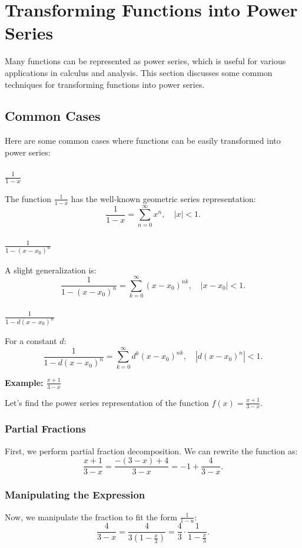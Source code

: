 \section{Transforming Functions into Power Series}

Many functions can be represented as power series, which is useful for various applications in calculus and analysis. This section discusses some common techniques for transforming functions into power series.

\subsection{Common Cases}
Here are some common cases where functions can be easily transformed into power series:

\subsubsection{\(\frac{1}{1 - x}\)}
The function \(\frac{1}{1 - x}\) has the well-known geometric series representation:
\[
\frac{1}{1 - x} = \sum_{n=0}^{\infty} x^n, \quad |x| < 1.
\]

\subsubsection{\(\frac{1}{1 - (x - x_0)^n}\)}
A slight generalization is:
\[
\frac{1}{1 - (x - x_0)^n} = \sum_{k=0}^{\infty} (x - x_0)^{nk}, \quad |x - x_0| < 1.
\]

\subsubsection{\(\frac{1}{1 - d(x - x_0)^n}\)}
For a constant \(d\):
\[
\frac{1}{1 - d(x - x_0)^n} = \sum_{k=0}^{\infty} d^k (x - x_0)^{nk}, \quad |d(x - x_0)^n| < 1.
\]

\textbf{Example: \(\frac{x + 1}{3 - x}\)}

Let's find the power series representation of the function \(f(x) = \frac{x + 1}{3 - x}\).

\subsubsection{Partial Fractions}

First, we perform partial fraction decomposition. We can rewrite the function as:
\[
\frac{x + 1}{3 - x} = \frac{-(3 - x) + 4}{3 - x} = -1 + \frac{4}{3 - x}.
\]

\subsubsection{Manipulating the Expression}
Now, we manipulate the fraction to fit the form \(\frac{1}{1 - u}\):
\[
\frac{4}{3 - x} = \frac{4}{3(1 - \frac{x}{3})} = \frac{4}{3} \cdot \frac{1}{1 - \frac{x}{3}}.
\]

